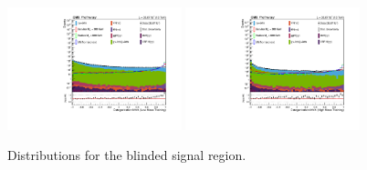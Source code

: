 \begin{figure}[thb]
  \centering
\includegraphics[width=0.45\textwidth]{figures/sec-control/LOG_HHTagger_LM}\hfil
\includegraphics[width=0.45\textwidth]{figures/sec-control/LOG_HHTagger_HM}\hfil
  \caption{Distributions for the blinded signal region.}
\label{fig:cp_mgg8}
\end{figure}

